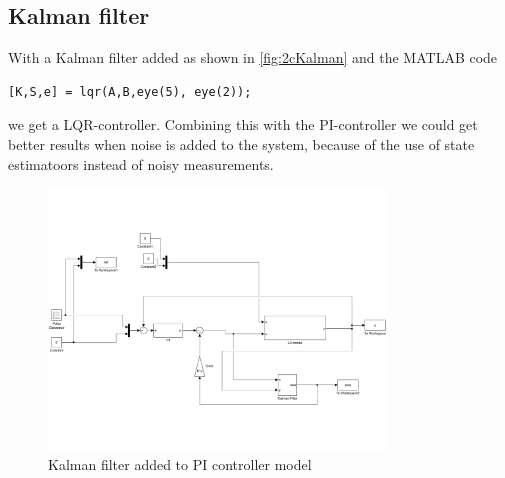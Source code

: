 \documentclass[a4paper]{scrartcl}
\begin{document}
\subsection{Kalman filter}
With a Kalman filter added as shown in \autoref{fig:2cKalman} and the MATLAB code 
\begin{lstlisting}[style = Matlab-editor]
	[K,S,e] = lqr(A,B,eye(5), eye(2));
\end{lstlisting}
we get a LQR-controller. Combining this with the PI-controller we could get better results when noise is added to the system, because of the use of state estimatoors instead of noisy measurements.
\begin{figure}[ht!]
	\centering
	\includegraphics[width=0.8\textwidth]{fig/Kalman.pdf}
	\caption{Kalman filter added to PI controller model}
	\label{fig:2cKalman}
\end{figure}
\end{document}
